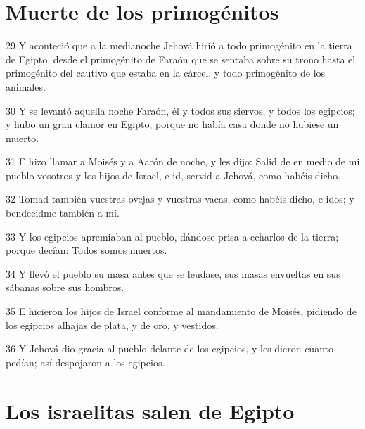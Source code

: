 \section*{Muerte de los primogénitos}

\par 29 Y aconteció que a la medianoche Jehová hirió a todo primogénito en la tierra de Egipto, desde el primogénito de Faraón que se sentaba sobre su trono hasta el primogénito del cautivo que estaba en la cárcel, y todo primogénito de los animales.
\par 30 Y se levantó aquella noche Faraón, él y todos sus siervos, y todos los egipcios; y hubo un gran clamor en Egipto, porque no había casa donde no hubiese un muerto.
\par 31 E hizo llamar a Moisés y a Aarón de noche, y les dijo: Salid de en medio de mi pueblo vosotros y los hijos de Israel, e id, servid a Jehová, como habéis dicho.
\par 32 Tomad también vuestras ovejas y vuestras vacas, como habéis dicho, e idos; y bendecidme también a mí.
\par 33 Y los egipcios apremiaban al pueblo, dándose prisa a echarlos de la tierra; porque decían: Todos somos muertos.
\par 34 Y llevó el pueblo su masa antes que se leudase, sus masas envueltas en sus sábanas sobre sus hombros.
\par 35 E hicieron los hijos de Israel conforme al mandamiento de Moisés, pidiendo de los egipcios alhajas de plata, y de oro, y vestidos.
\par 36 Y Jehová dio gracia al pueblo delante de los egipcios, y les dieron cuanto pedían; así despojaron a los egipcios.

\section*{Los israelitas salen de Egipto}

